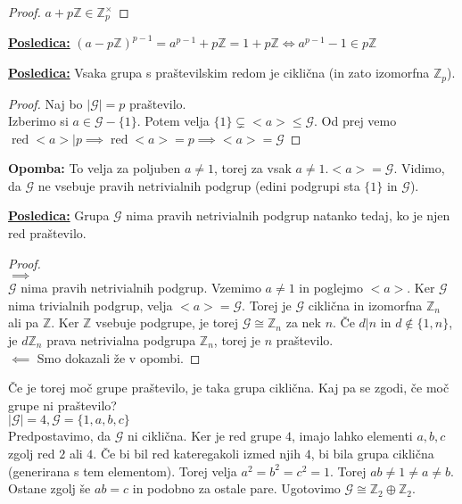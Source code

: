 \documentclass[a4paper]{article}
\newcounter{environment:definition_counter}
\newcounter{environment:theorem_counter}
\newcounter{environment:statement_counter}
\newenvironment{remark}
{\textbf{Opomba:}}
{}
\newenvironment{corollary}
{\underline{\textbf{Posledica:}}}
{}
\newcommand{\ord}{\ensuremath{\operatorname{red}}} %
\begin{document}
\begin{proof}
$a + p \mathbb{Z} \in \mathbb{Z}_p^\times$
\end{proof}

\begin{corollary}
$(a - p\mathbb{Z})^{p-1} = a^{p-1} + p \mathbb{Z} = 1 + p\mathbb{Z} \iff a^{p-1} - 1 \in p\mathbb{Z}$
\end{corollary}

\begin{corollary}
Vsaka grupa s praštevilskim redom je ciklična (in zato izomorfna $\mathbb{Z}_p$).
\end{corollary}

\begin{proof}
Naj bo $|\mathcal{G}| = p$ praštevilo. \\Izberimo si $a \in \mathcal{G} - \{1 \}$. Potem velja $\{1\} \subsetneq <a> \leq \mathcal{G}$. Od prej vemo $\ord <a> | p \implies \ord <a> = p \implies <a> = \mathcal{G}$
\end{proof}

\begin{remark}
To velja za poljuben $a \neq 1$, torej za vsak $a \neq 1.<a> = \mathcal{G}$. Vidimo, da $\mathcal{G}$ ne vsebuje pravih netrivialnih podgrup (edini podgrupi sta $\{1\}$ in $\mathcal{G}$).
\end{remark}

\begin{corollary}
Grupa $\mathcal{G}$ nima pravih netrivialnih podgrup natanko tedaj, ko je njen red praštevilo.
\end{corollary}

\begin{proof}\leavevmode\\
$\implies$\\
$\mathcal{G}$ nima pravih netrivialnih podgrup. Vzemimo $a \neq 1$ in poglejmo $<a>$. Ker $\mathcal{G}$ nima trivialnih podgrup, velja $<a> = \mathcal{G}$. Torej je $\mathcal{G}$ ciklična in izomorfna $\mathbb{Z}_n$ ali pa $\mathbb{Z}$. Ker $\mathbb{Z}$ vsebuje podgrupe, je torej $\mathcal{G} \cong \mathbb{Z}_n$ za nek $n$. Če $d|n$ in $d \not \in \{1,n\}$, je $d\mathbb{Z}_n$ prava netrivialna podgrupa $\mathbb{Z}_n$, torej je $n$ praštevilo.\\
$\impliedby$ Smo dokazali že v opombi.
\end{proof}

Če je torej moč grupe praštevilo, je taka grupa ciklična. Kaj pa se zgodi, če moč grupe ni praštevilo?\\
$|\mathcal{G}| = 4, \mathcal{G} = \{1,a,b,c\}$\\
Predpostavimo, da $\mathcal{G}$ ni ciklična. Ker je red grupe $4$, imajo lahko elementi $a,b,c$ zgolj red $2$ ali $4$. Če bi bil red kateregakoli izmed njih $4$, bi bila grupa ciklična (generirana s tem elementom). Torej velja $a^2=b^2=c^2 = 1$. Torej $ab \neq 1 \neq a \neq b$. Ostane zgolj še $ab = c$ in podobno za ostale pare. Ugotovimo $\mathcal{G} \cong \mathbb{Z}_2 \oplus \mathbb{Z}_2$.
\end{document}
